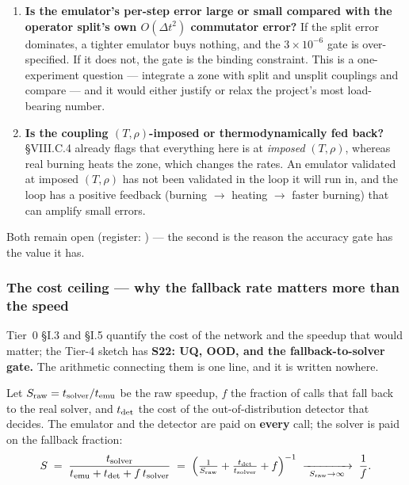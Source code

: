 \begin{enumerate}
\item \textbf{Is the emulator's per-step error large or small compared with the
  operator split's own $O(\Delta t^2)$ commutator error?} If the split error
  dominates, a tighter emulator buys nothing, and the $3\times10^{-6}$ gate is
  over-specified. If it does not, the gate is the binding constraint. This is a
  one-experiment question --- integrate a zone with split and unsplit couplings
  and compare --- and it would either justify or relax the project's most
  load-bearing number.
\item \textbf{Is the coupling $(T, \rho)$-imposed or thermodynamically fed
  back?}  \S VIII.C.4 already flags that everything here is at
  \emph{imposed} $(T, \rho)$, whereas real burning heats the zone, which changes
  the rates. An emulator validated at imposed $(T, \rho)$ has not been validated
  in the loop it will run in, and the loop has a positive feedback (burning
  $\to$ heating $\to$ faster burning) that can amplify small errors.
\end{enumerate}

Both remain open (register: ) --- the second is the reason the
accuracy gate has the value it has.

\subsubsection{The cost ceiling --- why the fallback rate matters more than the
               speed}
\label{sec:costceiling}

Tier~0 \S I.3 and \S I.5 quantify the cost of the network and the speedup that
would matter; the Tier-4 sketch has \textbf{S22: UQ, OOD, and the
fallback-to-solver gate.} The arithmetic connecting them is one line, and it is
written nowhere.

Let $S_{\rm raw} = t_{\rm solver}/t_{\rm emu}$ be the raw speedup, $f$ the
fraction of calls that fall back to the real solver, and $t_{\rm det}$ the cost
of the out-of-distribution detector that decides. The emulator and the detector
are paid on \textbf{every} call; the solver is paid on the fallback fraction:
%
\begin{equation}
S \;=\; \frac{t_{\mathrm{solver}}}
             {t_{\mathrm{emu}} + t_{\mathrm{det}} + f\,t_{\mathrm{solver}}}
  \;=\; \Bigl(\tfrac{1}{S_{\mathrm{raw}}}
              + \tfrac{t_{\mathrm{det}}}{t_{\mathrm{solver}}} + f\Bigr)^{-1}
  \;\xrightarrow[\ S_{\mathrm{raw}}\to\infty\ ]{}\; \frac{1}{f}.
\label{eq:costceiling}
\end{equation}
\derivedhere


